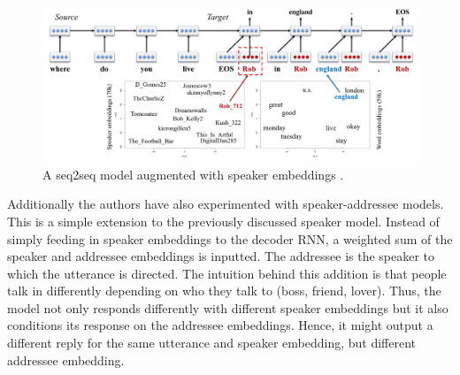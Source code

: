 \documentclass[12pt]{article}
\begin{document}
\begin{figure}[H]
	\centering
	\includegraphics[width=1.0\textwidth]{pics/persona.png}
	\caption{A seq2seq model augmented with speaker embeddings \cite{Li:2016}.}
	\label{fig:persona}
\end{figure}
Additionally the authors have also experimented with speaker-addressee models. This is a simple extension to the previously discussed speaker model. Instead of simply feeding in speaker embeddings to the decoder RNN, a weighted sum of the speaker and addressee embeddings is inputted. The addressee is the speaker to which the utterance is directed. The intuition behind this addition is that people talk in differently depending on who they talk to (boss, friend, lover). Thus, the model not only responds differently with different speaker embeddings but it also conditions its response on the addressee embeddings. Hence, it might output a different reply for the same utterance and speaker embedding, but different addressee embedding.
\end{document}
